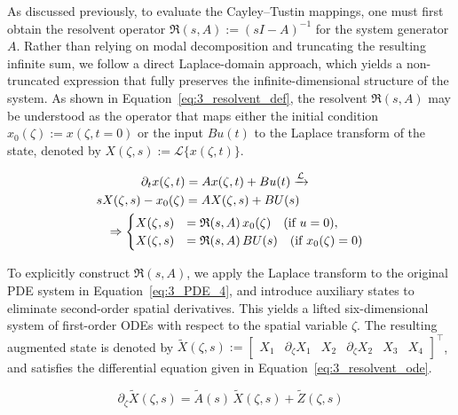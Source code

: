 As discussed previously, to evaluate the Cayley--Tustin mappings, one must first obtain the resolvent operator $\mathfrak{R}(s, A) := (sI - A)^{-1}$ for the system generator $A$. Rather than relying on modal decomposition and truncating the resulting infinite sum, we follow a direct Laplace-domain approach\autocite{Khatibi2021Model, Moadeli2025Model}, which yields a non-truncated expression that fully preserves the infinite-dimensional structure of the system. As shown in Equation~\eqref{eq:3_resolvent_def}, the resolvent $\mathfrak{R}(s, A)$ may be understood as the operator that maps either the initial condition $x_0(\zeta) := x(\zeta, t=0)$ or the input $B u(t)$ to the Laplace transform of the state, denoted by $X(\zeta, s) := \mathcal{L}\{x(\zeta, t)\}$.


\begin{equation} \label{eq:3_resolvent_def}
\begin{aligned}
    &\hspace{3.6em}\partial_t x(\zeta, t) = A x(\zeta, t) + B u(t) \xrightarrow{\mathcal{L}} \\
    &s X(\zeta, s) - x_0(\zeta) = A X(\zeta, s) + B U(s) \\
    &\hspace{0.8em}\Rightarrow \begin{cases}
        X(\zeta, s) &= \mathfrak{R}(s, A)\, x_0(\zeta) \quad \text{(if $u = 0$)}, \\
        X(\zeta, s) &= \mathfrak{R}(s, A)\, B U(s) \quad \text{(if $x_0(\zeta) = 0$)}
    \end{cases}
\end{aligned}
\end{equation}

To explicitly construct $\mathfrak{R}(s, A)$, we apply the Laplace transform to the original PDE system in Equation~\eqref{eq:3_PDE_4}, and introduce auxiliary states to eliminate second-order spatial derivatives. This yields a lifted six-dimensional system of first-order ODEs with respect to the spatial variable $\zeta$. The resulting augmented state is denoted by $\tilde{X}(\zeta, s) := \begin{bmatrix} X_1 & \partial_\zeta X_1 & X_2 & \partial_\zeta X_2 & X_3 & X_4 \end{bmatrix}^\top$, and satisfies the differential equation given in Equation~\eqref{eq:3_resolvent_ode}.

\begin{equation} \label{eq:3_resolvent_ode}
    \partial_\zeta \tilde{X}(\zeta, s) = \tilde{A}(s)\, \tilde{X}(\zeta, s) + \tilde{Z}(\zeta, s)
\end{equation}

